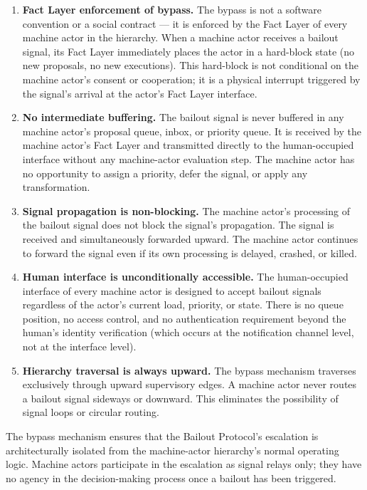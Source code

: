 \begin{enumerate}

\item \textbf{Fact Layer enforcement of bypass.} The bypass is not a software convention or a social contract --- it is enforced by the Fact Layer of every machine actor in the hierarchy. When a machine actor receives a bailout signal, its Fact Layer immediately places the actor in a hard-block state (no new proposals, no new executions). This hard-block is not conditional on the machine actor's consent or cooperation; it is a physical interrupt triggered by the signal's arrival at the actor's Fact Layer interface.

\item \textbf{No intermediate buffering.} The bailout signal is never buffered in any machine actor's proposal queue, inbox, or priority queue. It is received by the machine actor's Fact Layer and transmitted directly to the human-occupied interface without any machine-actor evaluation step. The machine actor has no opportunity to assign a priority, defer the signal, or apply any transformation.

\item \textbf{Signal propagation is non-blocking.} The machine actor's processing of the bailout signal does not block the signal's propagation. The signal is received and simultaneously forwarded upward. The machine actor continues to forward the signal even if its own processing is delayed, crashed, or killed.

\item \textbf{Human interface is unconditionally accessible.} The human-occupied interface of every machine actor is designed to accept bailout signals regardless of the actor's current load, priority, or state. There is no queue position, no access control, and no authentication requirement beyond the human's identity verification (which occurs at the notification channel level, not at the interface level).

\item \textbf{Hierarchy traversal is always upward.} The bypass mechanism traverses exclusively through upward supervisory edges. A machine actor never routes a bailout signal sideways or downward. This eliminates the possibility of signal loops or circular routing.

\end{enumerate}

The bypass mechanism ensures that the Bailout Protocol's escalation is architecturally isolated from the machine-actor hierarchy's normal operating logic. Machine actors participate in the escalation as signal relays only; they have no agency in the decision-making process once a bailout has been triggered.

